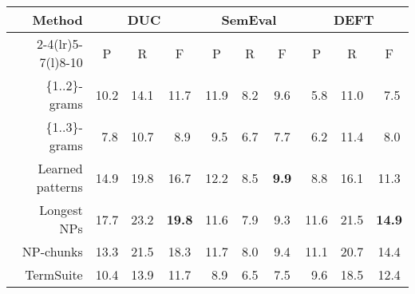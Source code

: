       \begin{table*}
        \centering
        \begin{tabular}{rccccccccc}
          \toprule
          \multirow{2}{*}[-2pt]{\textbf{Method}} & \multicolumn{3}{c}{\textbf{DUC}} & \multicolumn{3}{c}{\textbf{SemEval}} & \multicolumn{3}{c}{\textbf{DEFT}}\\
          \cmidrule(r){2-4}\cmidrule(lr){5-7}\cmidrule(l){8-10}
          & P & R & F & P & R & F & P & R & F\\
          \midrule
          \{1..2\}-grams & 10.2 & 14.1 & 11.7 & 11.9 & $~~$8.2 & $~~$9.6 & $~~$5.8 & 11.0 & $~~$7.5\\
          \{1..3\}-grams & $~~$7.8 & 10.7 & $~~$8.9 & $~~$9.5 & $~~$6.7 & $~~$7.7 & $~~$6.2 & 11.4 & $~~$8.0\\
          Learned patterns & 14.9 & 19.8 & 16.7 & 12.2 & $~~$8.5 & \textbf{$~~$9.9} & $~~$8.8 & 16.1 & 11.3\\
          Longest NPs & 17.7 & 23.2 & \textbf{19.8} & 11.6 & $~~$7.9 & $~~$9.3 & 11.6 & 21.5 & \textbf{14.9}\\
          NP-chunks & 13.3 & 21.5 & 18.3 & 11.7 & $~~$8.0 & $~~$9.4 & 11.1 & 20.7 & 14.4\\
          TermSuite & 10.4 & 13.9 & 11.7 & $~~$8.9 & $~~$6.5 & $~~$7.5 & $~~$9.6 & 18.5 & 12.4\\
          \bottomrule
        \end{tabular}
        \caption{Comparison of candidate extraction methods, when extracting 10
                 keyphrases with \textbf{TopicRank}.
                 \label{tab:topicrank_results}}
      \end{table*}
